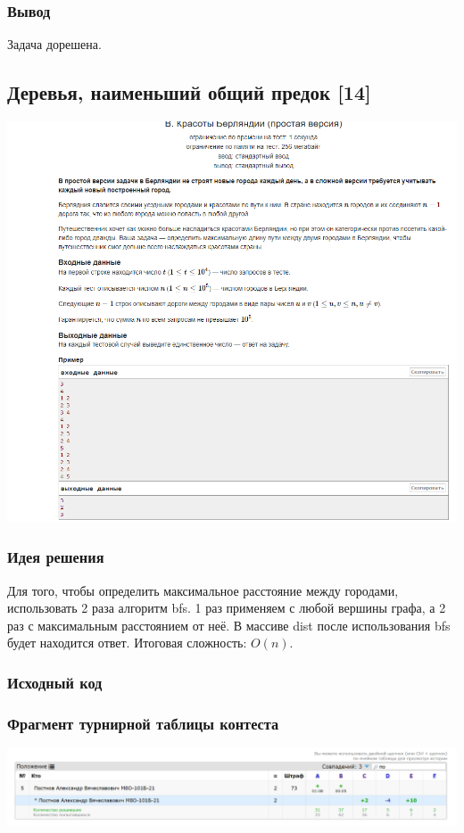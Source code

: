 \subsubsection*{Вывод}
Задача дорешена.

\vspace{20pt}

\pagebreak

\subsection*{Деревья, наименьший общий предок [14]}
\begin{center}
\includegraphics[width=\textwidth]{statements/16.png}
\end{center}
\subsubsection*{Идея решения}
Для того, чтобы определить максимальное расстояние между городами, использовать 2 раза алгоритм bfs. 1 раз применяем с любой вершины графа, а 2 раз с максимальным расстоянием от неё. В массиве dist после использования bfs будет находится ответ. 
Итоговая сложность: $O(n)$.
\subsubsection*{Исходный код}


\subsubsection*{Фрагмент турнирной таблицы контеста}
\begin{center}
\includegraphics[width=\textwidth]{standings/16.png}\newline\noindent
\end{center}


